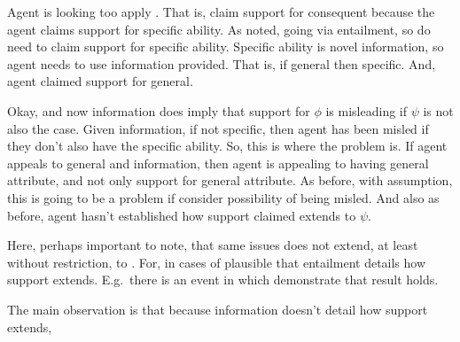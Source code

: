 \begin{note}
  \color{red}

  Agent is looking too apply \AR{}.
  That is, claim support for consequent because the agent claims support for specific ability.
  As noted, going via entailment, so do need to claim support for specific ability.
  Specific ability is novel information, so agent needs to use information provided.
  That is, if general then specific.
  And, agent claimed support for general.

  Okay, and now information does imply that support for \(\phi\) is misleading if \(\psi\) is not also the case.
  Given information, if not specific, then agent has been misled if they don't also have the specific ability.
  So, this is where the problem is.
  If agent appeals to general and information, then agent is appealing to having general attribute, and not only support for general attribute.
  As before, with assumption, this is going to be a problem if consider possibility of being misled.
  And also as before, agent hasn't established how support claimed extends to \(\psi\).

  Here, perhaps important to note, that same issues does not extend, at least without restriction, to \pe{}.
  For, in cases of \pe{} plausible that entailment details how support extends.
  E.g.\ there is an event in which demonstrate that result holds.

  The main observation is that because information doesn't detail how support extends, 
\end{note}

